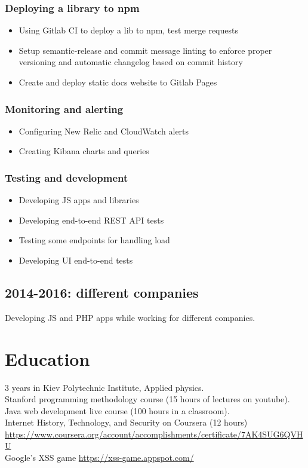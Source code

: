 \documentclass[a4paper, 14pt]{article}
\begin{document}
		\subsubsection{Deploying a library to npm}
			\begin{itemize}
				\item Using Gitlab CI to deploy a lib to npm, test merge requests \\
				\item Setup semantic-release and commit message linting to enforce proper versioning and automatic changelog based on commit history \\
				\item Create and deploy static docs website to Gitlab Pages
			\end{itemize}

		\subsubsection{Monitoring and alerting}
			\begin{itemize}
				\item Configuring New Relic and CloudWatch alerts \\
				\item Creating Kibana charts and queries
			\end{itemize}

		\subsubsection{Testing and development}
			\begin{itemize}
				\item Developing JS apps and libraries \\
				\item Developing end-to-end REST API tests \\
				\item Testing some endpoints for handling load \\
				\item Developing UI end-to-end tests
			\end{itemize}

  \subsection{2014-2016: different companies}
    Developing JS and PHP apps while working for different companies.

\section{Education}
	3 years in Kiev Polytechnic Institute, Applied physics. \\
	Stanford programming methodology course (15 hours of lectures on youtube). \\
	Java web development live course (100 hours in a classroom). \\
  Internet History, Technology, and Security on Coursera (12 hours) \url{https://www.coursera.org/account/accomplishments/certificate/7AK4SUG6QVHU} \\
  Google's XSS game \url{https://xss-game.appspot.com/}
\end{document}
